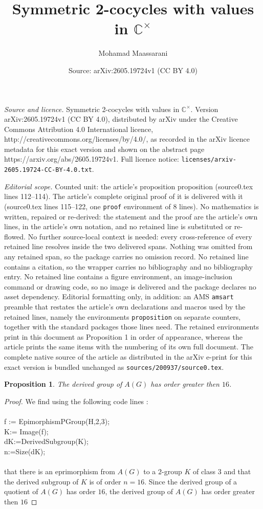 \documentclass[10pt,a4paper]{amsart}
\title{Symmetric 2-cocycles with values in $\mathbb{C}^\times$}
\author{Mohamad Maassarani}
\date{Source: arXiv:2605.19724v1 (CC BY 4.0)}
\newtheorem{proposition}{Proposition}
\begin{document}
\maketitle

\noindent\emph{Source and licence.} Symmetric 2-cocycles with values in $\mathbb{C}^\times$. Version arXiv:2605.19724v1 (CC BY 4.0), distributed by arXiv under the Creative Commons Attribution 4.0 International licence, http://creativecommons.org/licenses/by/4.0/, as recorded in the arXiv licence metadata for this exact version and shown on the abstract page https://arxiv.org/abs/2605.19724v1. Full licence notice: \texttt{licenses/arxiv-2605.19724-CC-BY-4.0.txt}.\par\smallskip

\noindent\textit{Editorial scope.} Counted unit: the article's proposition proposition (source0.tex lines 112--114). The article's complete original proof of it is delivered with it (source0.tex lines 115--122, one \texttt{proof} environment of 8 lines). No mathematics is written, repaired or re-derived: the statement and the proof are the article's own lines, in the article's own notation, and no retained line is substituted or re-flowed.  No further source-local context is needed: every cross-reference of every retained line resolves inside the two delivered spans.  Nothing was omitted from any retained span, so the package carries no omission record.  No retained line contains a citation, so the wrapper carries no bibliography and no bibliography entry.  No retained line contains a figure environment, an image-inclusion command or drawing code, so no image is delivered and the package declares no asset dependency.  Editorial formatting only, in addition: an AMS \texttt{amsart} preamble that restates the article's own declarations and macros used by the retained lines, namely the environments \texttt{proposition} on separate counters, together with the standard packages those lines need.  The retained environments print in this document as Proposition 1 in order of appearance, whereas the article prints the same items with the numbering of its own full document.  The complete native source of the article as distributed in the arXiv e-print for this exact version is bundled unchanged as \texttt{sources/200937/source0.tex}.
\begin{proposition}
The derived group of $A(G)$ has order greater then $16$.
\end{proposition}

\begin{proof} 
We find using the following code lines :\\\\
f := EpimorphismPGroup(H,2,3);\\
K:= Image(f);\\
dK:=DerivedSubgroup(K);\\
n:=Size(dK);\\\\
that there is an eprimorphism from $A(G)$ to a $2$-group  $K$ of class $3$ and that the derived subgroup of $K$ is of order $n=16$. Since the derived group of a quotient of $A(G)$ has order $16$, the derived group of $A(G)$ has order greater then $16$
\end{proof}
\end{document}
